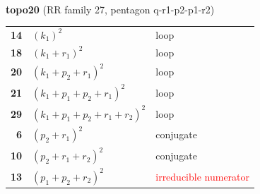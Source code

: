 \documentclass[10pt]{article}
\begin{document}
\begin{minipage}[t]{0.48\textwidth}
{}\\[2mm]\textbf{topo20} (RR family 27, pentagon q-r1-p2-p1-r2)\\[2pt]{\footnotesize\begin{tabular}{@{}r@{\ \ }l@{\ \ }l@{}}\textbf{14} & $(k_1)^2$ & loop\\
\textbf{18} & $(k_1+r_1)^2$ & loop\\
\textbf{20} & $(k_1+p_2+r_1)^2$ & loop\\
\textbf{21} & $(k_1+p_1+p_2+r_1)^2$ & loop\\
\textbf{29} & $(k_1+p_1+p_2+r_1+r_2)^2$ & loop\\
\textbf{6} & $(p_2+r_1)^2$ & conjugate\\
\textbf{10} & $(p_2+r_1+r_2)^2$ & conjugate\\
\textbf{13} & $(p_1+p_2+r_2)^2$ & \textcolor{red}{irreducible numerator}\\\end{tabular}}\end{minipage}

\bigskip
\end{document}
